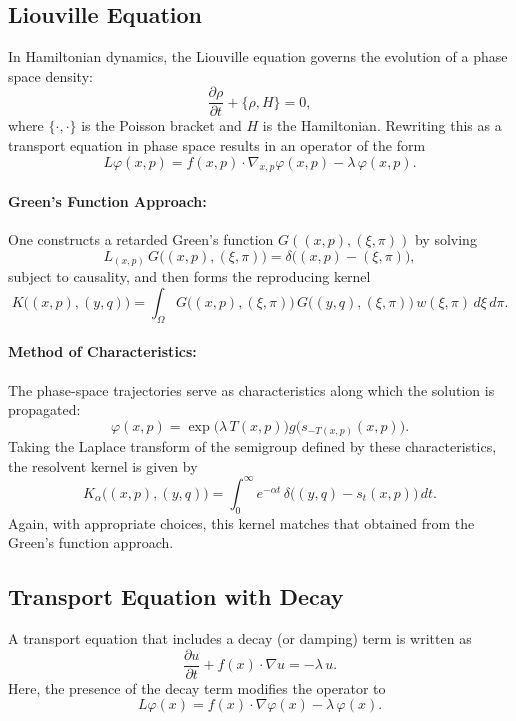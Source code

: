 \documentclass[11pt]{article}
\theoremstyle{plain}
\def\[{\begin{equation}}
\def\]{\end{equation}}
\begin{document}
\medskip

\subsection{Liouville Equation}

In Hamiltonian dynamics, the Liouville equation governs the evolution of a phase space density:
\[
\frac{\partial \rho}{\partial t} + \{\rho, H\} = 0,
\]
where \(\{\cdot,\cdot\}\) is the Poisson bracket and \(H\) is the Hamiltonian. Rewriting this as a transport equation in phase space results in an operator of the form
\[
L\varphi(x,p)= f(x,p) \cdot \nabla_{x,p} \varphi(x,p) - \lambda\, \varphi(x,p).
\]

\paragraph{Green's Function Approach:}  
One constructs a retarded Green's function \(G((x,p),(\xi,\pi))\) by solving
\[
L_{(x,p)}\,G\bigl((x,p),(\xi,\pi)\bigr)= \delta\bigl((x,p)-(\xi,\pi)\bigr),
\]
subject to causality, and then forms the reproducing kernel
\[
K\bigl((x,p),(y,q)\bigr)= \int_{\Omega} G\bigl((x,p),(\xi,\pi)\bigr)\,G\bigl((y,q),(\xi,\pi)\bigr)\,w(\xi,\pi)\, d\xi\,d\pi.
\]

\paragraph{Method of Characteristics:}  
The phase-space trajectories serve as characteristics along which the solution is propagated:
\[
\varphi(x,p)= \exp\!\bigl(\lambda\,T(x,p)\bigr)g\bigl(s_{-T(x,p)}(x,p)\bigr).
\]
Taking the Laplace transform of the semigroup defined by these characteristics, the resolvent kernel is given by
\[
K_\alpha\bigl((x,p),(y,q)\bigr)= \int_{0}^{\infty} e^{-\alpha t}\, \delta\bigl((y,q)-s_t(x,p)\bigr)\,dt.
\]
Again, with appropriate choices, this kernel matches that obtained from the Green’s function approach.

\medskip

\subsection{Transport Equation with Decay}

A transport equation that includes a decay (or damping) term is written as
\[
\frac{\partial u}{\partial t} + f(x) \cdot \nabla u = -\lambda\, u.
\]
Here, the presence of the decay term modifies the operator to
\[
L\varphi(x)= f(x) \cdot \nabla \varphi(x) - \lambda\, \varphi(x).
\]
\end{document}
